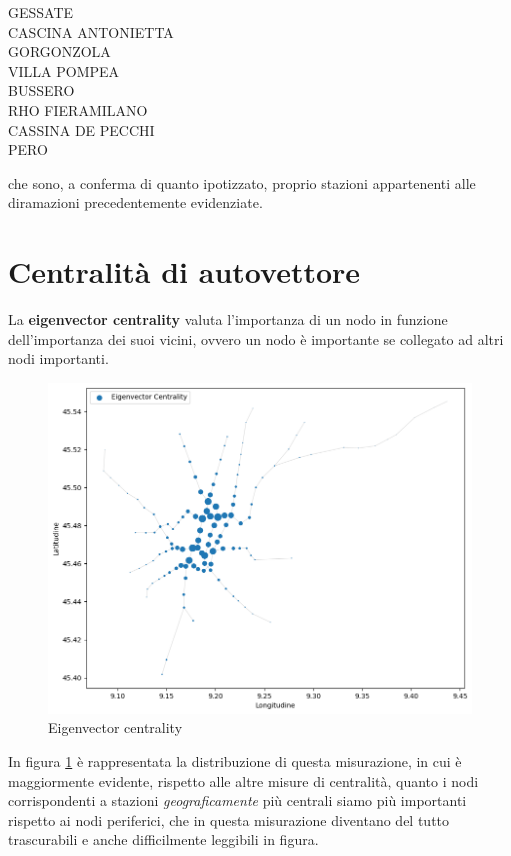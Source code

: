 \begin{center}
GESSATE \\
CASCINA ANTONIETTA \\
GORGONZOLA \\
VILLA POMPEA \\
BUSSERO \\
RHO FIERAMILANO \\
CASSINA DE PECCHI \\
PERO \\
\end{center}

che sono, a conferma di quanto ipotizzato, proprio stazioni appartenenti alle diramazioni precedentemente evidenziate.

\section{Centralità di autovettore}
La \textbf{eigenvector centrality} valuta l'importanza di un nodo in funzione dell'importanza dei suoi vicini, ovvero un nodo è importante se collegato ad altri nodi importanti.

\vspace{1em}
\begin{figure}[h!]
    \centering
    \includegraphics[width=0.8\linewidth]{Immagini//Capitoli//cap4/eigen_centr.png}
    \caption{Eigenvector centrality}
    \label{fig: Eigenvector Centrality}
\end{figure}
\vspace{1em}

In figura \ref{fig: Eigenvector Centrality} è rappresentata la distribuzione di questa misurazione, in cui è maggiormente evidente, rispetto alle altre misure di centralità, quanto i nodi corrispondenti a stazioni \textit{geograficamente} più centrali siamo più importanti rispetto ai nodi periferici, che in questa misurazione diventano del tutto trascurabili e anche difficilmente leggibili in figura.